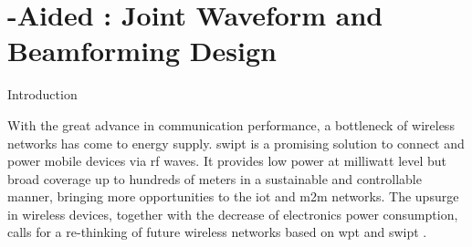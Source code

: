 
\graphicspath{{assets/chapter_3/}}

\chapter{-Aided : Joint Waveform and Beamforming Design}\label{ch:ris_aided_swipt}

\begin{section}{Introduction}
	\begin{subsection}{}
		With the great advance in communication performance, a bottleneck of wireless networks has come to energy supply. \gls{swipt} is a promising solution to connect and power mobile devices via \gls{rf} waves. It provides low power at milliwatt level but broad coverage up to hundreds of meters in a sustainable and controllable manner, bringing more opportunities to the \gls{iot} and \gls{m2m} networks. The upsurge in wireless devices, together with the decrease of electronics power consumption, calls for a re-thinking of future wireless networks based on \gls{wpt} and \gls{swipt} \cite{Clerckx2019}.


\end{subsection}
\end{section}
